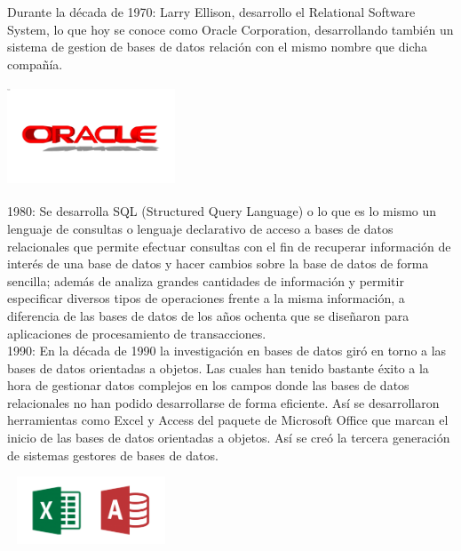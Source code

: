 \documentclass[twoside,twocolumn]{article}
\begin{document}
	Durante la década de 1970: Larry Ellison, desarrollo el Relational Software System, lo que hoy se conoce como Oracle Corporation, desarrollando también un sistema de gestion de bases de datos relación con el mismo nombre que dicha compañía. \\
	
	\begin{center}
		\includegraphics[width=5cm, height=3cm]{oracle.jpg}
	\end{center}
	
	1980: Se desarrolla SQL (Structured Query Language) o lo que es lo mismo un lenguaje de consultas o lenguaje declarativo de acceso a bases de datos relacionales que permite efectuar consultas con el fin de recuperar información de interés de una base de datos y hacer cambios sobre la base de datos de forma sencilla; además de analiza grandes cantidades de información y permitir especificar diversos tipos de operaciones frente a la misma información, a diferencia de las bases de datos de los años ochenta que se diseñaron para aplicaciones de procesamiento de transacciones. \\
	
	
	1990: En la década de 1990 la investigación en bases de datos giró en torno a las bases de datos orientadas a objetos. Las cuales han tenido bastante éxito a la hora de gestionar datos complejos en los campos donde las bases de datos relacionales no han podido desarrollarse de forma eficiente. Así se desarrollaron herramientas como Excel y Access del paquete de Microsoft Office que marcan el inicio de las bases de datos orientadas a objetos. Así se creó la tercera generación de sistemas gestores de bases de datos. \\
	
	\begin{center}
		\includegraphics[width=5cm, height=2cm]{excel-access.png}
	\end{center}
	
\end{document}
